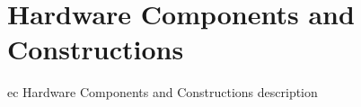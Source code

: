 \section{Hardware Components and Constructions}

ec Hardware Components and Constructions description

